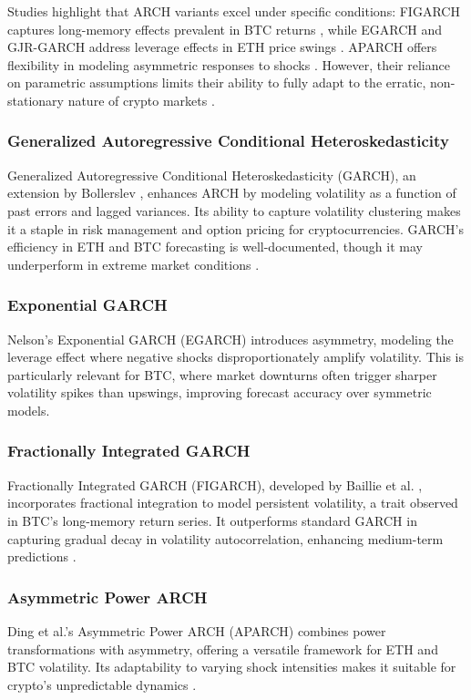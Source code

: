 \documentclass[9pt]{article}
\begin{document}
\begin{multicols}{2}
		Studies highlight that ARCH variants excel under specific conditions: FIGARCH captures long-memory effects prevalent in BTC returns \citep{baillie1996, rodriguez2017}, while EGARCH and GJR-GARCH address leverage effects in ETH price swings \citep{nelson1991, glosten1993}. APARCH offers flexibility in modeling asymmetric responses to shocks \citep{ding1993, szymoniak2020}. However, their reliance on parametric assumptions limits their ability to fully adapt to the erratic, non-stationary nature of crypto markets \citep{brooks2019}.
		
		\subsubsection{Generalized Autoregressive Conditional Heteroskedasticity}
		Generalized Autoregressive Conditional Heteroskedasticity (GARCH), an extension by Bollerslev \citep{bollerslev1986}, enhances ARCH by modeling volatility as a function of past errors and lagged variances. Its ability to capture volatility clustering makes it a staple in risk management and option pricing for cryptocurrencies. GARCH’s efficiency in ETH and BTC forecasting is well-documented, though it may underperform in extreme market conditions \citep{brooks2019}.
		
		\subsubsection{Exponential GARCH}
		Nelson’s Exponential GARCH (EGARCH) \citep{nelson1991} introduces asymmetry, modeling the leverage effect where negative shocks disproportionately amplify volatility. This is particularly relevant for BTC, where market downturns often trigger sharper volatility spikes than upswings, improving forecast accuracy over symmetric models.
		
		\subsubsection{Fractionally Integrated GARCH}
		Fractionally Integrated GARCH (FIGARCH), developed by Baillie et al. \citep{baillie1996}, incorporates fractional integration to model persistent volatility, a trait observed in BTC’s long-memory return series. It outperforms standard GARCH in capturing gradual decay in volatility autocorrelation, enhancing medium-term predictions \citep{rodriguez2017}.
		
		\subsubsection{Asymmetric Power ARCH}
		Ding et al.’s Asymmetric Power ARCH (APARCH) \citep{ding1993} combines power transformations with asymmetry, offering a versatile framework for ETH and BTC volatility. Its adaptability to varying shock intensities makes it suitable for crypto’s unpredictable dynamics \citep{szymoniak2020}.
		

\end{multicols}
\end{document}
